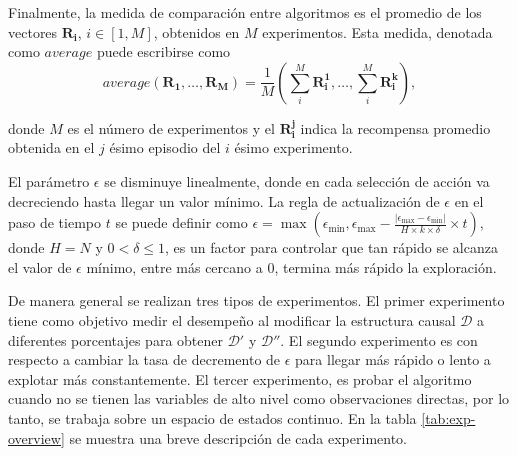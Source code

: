 Finalmente, la medida de comparación entre algoritmos es
el promedio de los vectores $\mathbf{R_i}$, $i\in [1, M]$,  obtenidos en $M$ experimentos. Esta medida, denotada como  $average$ puede escribirse como 
\begin{equation}
\label{eq:average}
average(\mathbf{R_1}, \dots, \mathbf{R_M}) = \frac{1}{M}(\sum^M_i \mathbf{R_{i}^1}, \dots, \sum^M_i\mathbf{R_{i}^k}),    
\end{equation}

donde $M$ es el número de experimentos y el $\mathbf{R_i^j}$ indica la recompensa promedio obtenida en el $j$ ésimo episodio del $i$ ésimo experimento.

El parámetro $\epsilon$ se disminuye linealmente, donde
en cada selección de acción va decreciendo hasta llegar
un valor mínimo. La regla de actualización de $\epsilon$ en
el paso de tiempo $t$ se puede definir como $\epsilon = \max(\epsilon_{\min}, \epsilon_{\max} - \frac{|\epsilon_{\max} - \epsilon_{\min}|}{H \times k \times \delta} \times t)$, donde $H=N$ y $0 < \delta \leq 1$, es un factor para controlar
que tan rápido se alcanza el valor de $\epsilon$  mínimo, entre más cercano a 0,
termina más rápido la exploración.

De manera general se realizan tres tipos de experimentos. El primer experimento tiene 
como objetivo medir el desempeño al modificar la estructura causal $\mathcal{D}$ a diferentes porcentajes para obtener $\mathcal{D'}$ y $\mathcal{D}''$. El segundo experimento es con respecto a cambiar la tasa de decremento
de $\epsilon$ para llegar más rápido o lento a explotar 
más constantemente. El tercer experimento, es probar
el algoritmo cuando no se tienen las variables
de alto nivel como observaciones directas, por lo tanto,
se trabaja sobre un espacio de estados continuo. En la tabla \ref{tab:exp-overview} se muestra una breve descripción de cada experimento.

